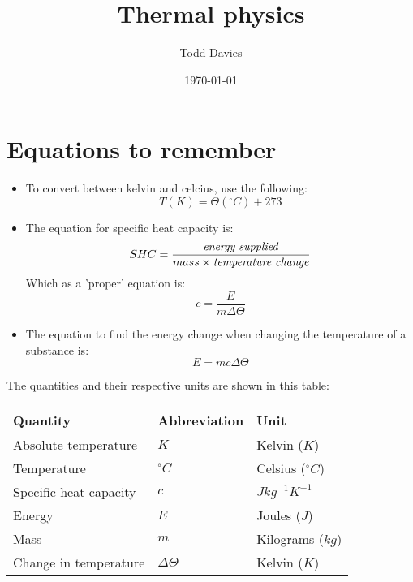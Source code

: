 \documentclass{article}
\title{Thermal physics}
\author{Todd Davies}
\date{\today}
\begin{document}
\lhead{\today}

\maketitle

\section*{Equations to remember}
\begin{itemize}
	\item To convert between kelvin and celcius, use the following:
	\[
		T(K) = \Theta(^\circ C) + 273
	\]
	\item The equation for specific heat capacity is:
	\[
		SHC = \frac{
				\textrm{\textit{energy supplied}}
			  }{
				mass \times \textrm{\textit{temperature change}}
			  }
	\]
	Which as a 'proper' equation is:
	\[
		c = \frac{E}{m \Delta \Theta}
	\]
	\item The equation to find the energy change when changing the temperature
	of a substance is:
	\[
		E = mc \Delta \Theta
	\]
\end{itemize}

The quantities and their respective units are shown in this table:

\begin{center}
	\begin{tabular}{|l|l|l|}
		\hline
			Quantity & Abbreviation & Unit \\ \hline
			Absolute temperature & $K$ & Kelvin ($K$) \\ \hline
			Temperature & $^\circ C$ & Celsius ($^\circ C$) \\ \hline
			Specific heat capacity & $c$ & $Jkg^{-1}K^{-1}$ \\ \hline
			Energy & $E$ & Joules ($J$)\\ \hline
			Mass & $m$ & Kilograms ($kg$)\\ \hline
			Change in temperature & $\Delta \Theta$ & Kelvin ($K$) \\ \hline
	\end{tabular}
\end{center}
\end{document}
